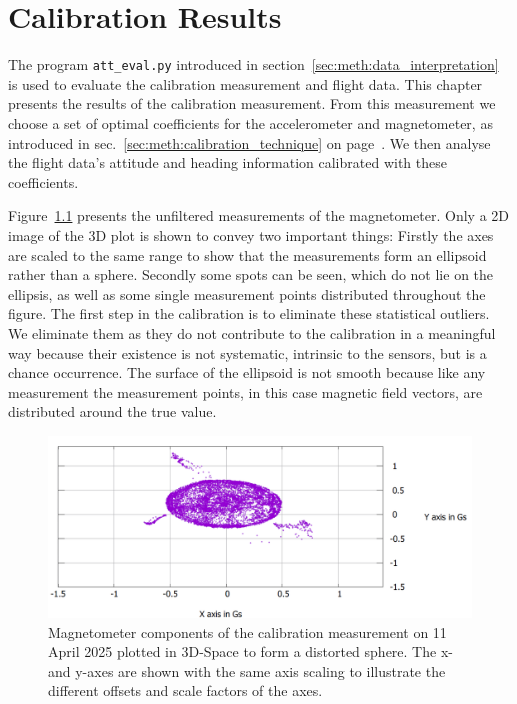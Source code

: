 \chapter{Calibration Results \label{ch:calibration_results}}
The program \verb|att_eval.py| introduced in section~\ref{sec:meth:data_interpretation} is used to evaluate the calibration measurement and flight data. This chapter presents the results of the calibration measurement. From this measurement we choose a set of optimal coefficients for the accelerometer and magnetometer, as introduced in sec.~\ref{sec:meth:calibration_technique} on page~\pageref{sec:meth:calibration_technique}. We then analyse the flight data's attitude and heading information calibrated with these coefficients.

Figure~\ref{fig:res:raw_cali} presents the unfiltered measurements of the magnetometer. Only a 2D image of the 3D plot is shown to convey two important things: Firstly the axes are scaled to the same range to show that the measurements form an ellipsoid rather than a sphere. Secondly some spots can be seen, which do not lie on the ellipsis, as well as some single measurement points distributed throughout the figure. The first step in the calibration is to eliminate these statistical outliers. We eliminate them as they do not contribute to the calibration in a meaningful way because their existence is not systematic, intrinsic to the sensors, but is a chance occurrence. The surface of the ellipsoid is not smooth because like any measurement the measurement points, in this case magnetic field vectors, are distributed around the true value. 

\begin{figure}[H]
    \centering
    \includegraphics[width=\linewidth]{images/04_calibration/raw_sphere_2025-04-11_x_y_axes.png}
    \caption[Magnetometer components of the calibration measurement on 11 April 2025 plotted in 3D-Space to form a distorted sphere.]{Magnetometer components of the calibration measurement on 11 April 2025 plotted in 3D-Space to form a distorted sphere. The x- and y-axes are shown with the same axis scaling to illustrate the different offsets and scale factors of the axes.}
    \label{fig:res:raw_cali}
\end{figure}

